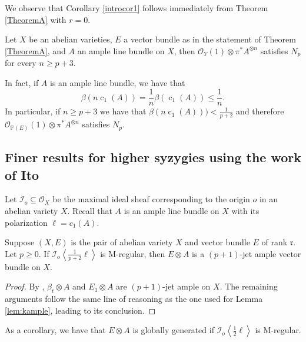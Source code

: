 \documentclass[11pt,letter]{amsart}
\numberwithin{equation}{section}
\begin{document}
   
     We observe that Corollary \ref{introcor1} follows immediately from Theorem \ref{TheoremA} with $r=0$.
     
     
   \begin{cor}\label{introcor1}
    Let $X$ be an abelian varieties, $E$ a vector bundle as in the statement of Theorem \ref{TheoremA}, and $A$ an ample line bundle on $X$, then $\mathcal{O}_Y(1)\otimes\pi^* A^{\otimes n}$ satisfies $N_p$ for every $n\geq p+3$.
  \end{cor}
  
  In fact, if $A$ is an ample line bundle, we have that 
   $$\beta(n\operatorname{c}_1(A))=\frac{1}{n}\beta(\operatorname{c}_1(A))\leq \frac{1}{n}.$$
In particular, if $n\geq p+3$ we have that $\beta(n\operatorname{c}_1(A)))<\frac{1}{p+2}$ and therefore $\mathcal{O}_{\mathbb{P}(E)}(1)\otimes\pi^*A^{\otimes n}$ satisfies $N_p$.





\subsection{Finer results for higher syzygies using the work of Ito}
Let $\mathcal{I}_o\subseteq\mathcal{O}_X$ be the maximal ideal sheaf corresponding to the origin $o$ in an abelian variety $X$. 
Recall that $A$ is an ample line bundle on $X$ with its polarization $\ell=c_1(A)$. 


\begin{prop}\label{prop5.1}
Suppose $(X,E)$ is the pair of abelian variety $X$ and vector bundle $E$ of rank $\mathfrak{r}$. Let $p\geq 0$.
If
$
\mathcal{I}_o\left\langle \frac{1}{p+2}\ell\right\rangle
$ is M-regular,
 then $E\otimes A$ is a $(p+1)$-jet ample vector bundle on $X$. 
\end{prop}




\begin{proof}
By \cite[Theorem 1.6]{Ito22}, $\beta_t\otimes A$ and $E_1\otimes A$ are $(p+1)$-jet ample on $X$. The remaining arguments follow the same line of reasoning as the one used for Lemma \ref{lem:kample}, leading to its conclusion.
\end{proof}
As a corollary, we have that $E\otimes A$ is globally generated if $
\mathcal{I}_o\left\langle \frac{1}{2}\ell\right\rangle
$ is M-regular. 
\end{document}
